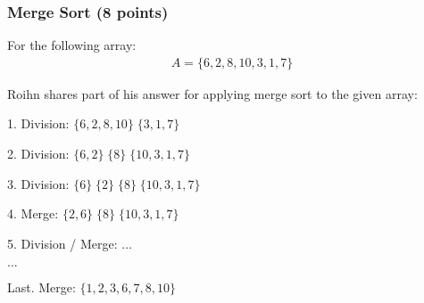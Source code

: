 \documentclass[11pt]{exam}
\begin{document}
\subsubsection{Merge Sort (8 points)}
For the following array:
\begin{align*}
A = \{6, 2, 8, 10, 3, 1, 7\}
\end{align*}

Roihn shares part of his answer for applying merge sort to the given array: 
\begin{solution}

1. Division: $\{6,2,8,10\}\;\{3,1,7\}$

2. Division: $\{6,2\}\;\{8\}\;\{10,3,1,7\}$

3. Division: $\{6\}\;\{2\}\;\{8\}\;\{10,3,1,7\}$

4. Merge: $\{2,6\}\;\{8\}\;\{10,3,1,7\}$

5. Division / Merge: $\dots$

$\dots$

Last. Merge: $\{1,2,3,6,7,8,10\}$
\end{solution}
\end{document}
